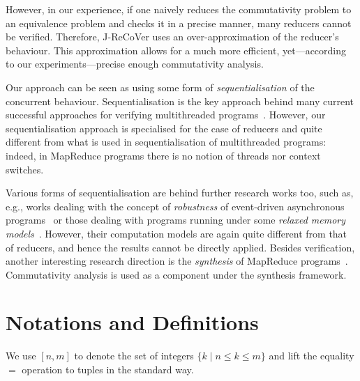 \documentclass{llncs}
\newcommand{\Var}{\mathtt{Var}}
\newcommand{\Exp}{\mathtt{Exp}}
\newcommand{\Cmd}{\mathtt{Cmd}}
\newcommand{\Grd}{\mathtt{Grd}}
\newcommand{\Prg}{\mathtt{Prg}}
\newcommand{\cur}{cur()}
\newcommand{\ite}[3]{
	 \ifmmode
	 \mathbf{if}\ #1 \ \mathbf{then}\ #2\  \mathbf{else}\ #3
	 \else
	 \textbf{if}\ #1 \ \textbf{then}\ #2\  \textbf{else}\ #3
	 \fi}
\newcommand{\rloop}{
	\ifmmode
	\mathbf{Loop}
	\else
	\textbf{Loop}
	\fi}
\newcommand{\Z}{\mathbb{Z}}
\begin{document}
However, in our experience, if one naively reduces the commutativity problem to
an equivalence problem and checks it in a precise manner, many reducers cannot
be verified. Therefore, J-ReCoVer uses an over-approximation of the reducer's
behaviour. This approximation allows for a much more efficient, yet---according
to our experiments---precise enough commutativity analysis.

Our approach can be seen as using some form of \emph{sequentialisation} of the
concurrent behaviour. Sequentialisation is the key approach behind many current
successful approaches for verifying multithreaded
programs~\cite{LalReps:Seq:08,LazyCSeq14}. However, our sequentialisation
approach is specialised for the case of reducers and quite different from what
is used in sequentialisation of multithreaded programs: indeed, in MapReduce
programs there is no notion of threads nor context switches.

Various forms of sequentialisation are behind further research works too, such
as, e.g., works dealing with the concept of \emph{robustness} of event-driven
asynchronous programs~\cite{ahmed2017:robustness} or those dealing with programs
running under some \emph{relaxed memory
models}~\cite{ahmed2013:robustness,AbdullaACLR13,AbdullaACLR12}. However, their
computation models are again quite different from that of reducers, and hence
the results cannot be directly applied.
Besides verification, another interesting research direction is the
\emph{synthesis} of MapReduce programs~\cite{SmithA16}. Commutativity analysis
is used as a component under the synthesis framework.

\section{Notations and Definitions} \label{section:integer-reducers}

We use $[n,m]$ to denote the set of integers $\{k\mid n \leq k\leq m\}$ and lift
the equality $=$ operation to tuples in the standard way.

\end{document}
